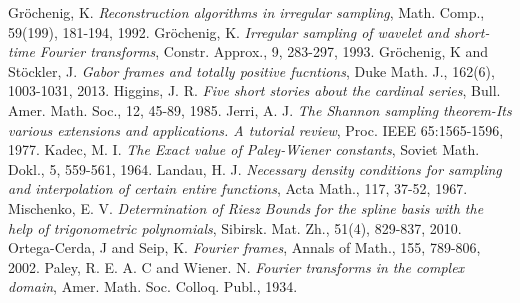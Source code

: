 \documentclass[a4paper,12pt,reqno]{amsart}
\theoremstyle{plain}
\numberwithin{equation}{section}
\theoremstyle{definition}
\begin{document}
\begin{thebibliography}{150}
 Gr\"{o}chenig, K. \emph{Reconstruction algorithms in  irregular sampling}, Math. Comp., 59(199), 181-194, 1992.
 Gr\"{o}chenig, K. \emph{Irregular sampling of wavelet and short-time Fourier transforms}, Constr. Approx., 9, 283-297, 1993.
 Gr\"{o}chenig, K and St\"{o}ckler, J. \emph{Gabor frames and totally positive fucntions}, Duke Math. J., 162(6), 1003-1031, 2013.
Higgins, J. R. \emph{Five short stories about the cardinal series}, Bull. Amer. Math. Soc., 12, 45-89, 1985.
 Jerri, A. J. \emph{The Shannon sampling theorem-Its various
extensions and applications. A tutorial review}, Proc. IEEE 65:1565-1596, 1977.
 Kadec, M. I. \emph{The Exact value of Paley-Wiener constants}, Soviet Math. Dokl., 5, 559-561, 1964.
 Landau, H. J. \emph{Necessary density conditions for sampling and interpolation of certain entire
functions}, Acta Math., 117, 37-52, 1967.
Mischenko, E. V. \emph{Determination of Riesz Bounds for the spline basis with the help of trigonometric polynomials}, Sibirsk. Mat. Zh., 51(4), 829-837, 2010.
Ortega-Cerda, J and Seip, K. \emph{Fourier frames}, Annals of Math., 155, 789-806, 2002. 
 Paley, R. E. A. C and Wiener. N. \emph{Fourier transforms in the complex domain}, Amer. Math. Soc. Colloq. Publ., 1934.

\end{thebibliography}
\end{document}
